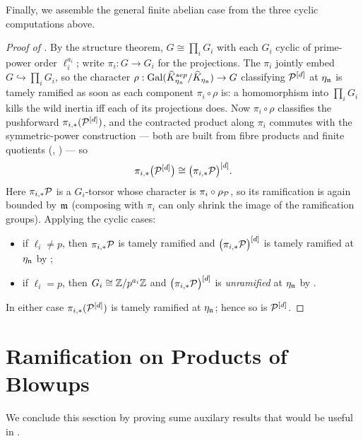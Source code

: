 Finally, we assemble the general finite abelian case from the three cyclic
computations above.

\begin{proof}[Proof of ]
    By the structure theorem, $G \cong \prod_i G_i$ with each $G_i$ cyclic of
    prime-power order $\ell_i^{a_i}$; write $\pi_i : G \to G_i$ for the
    projections. The $\pi_i$ jointly embed $G \hookrightarrow \prod_i G_i$, so
    the character $\rho : \operatorname{Gal}(\widehat K_{\eta_{\mathfrak{n}}}^{sep}/\widehat K_{\eta_{\mathfrak{n}}}) \to G$
    classifying $\mathcal{P}^{[d]}$ at $\eta_{\mathfrak{n}}$ is tamely ramified as soon as each
    component $\pi_i \circ \rho$ is: a homomorphism into $\prod_i G_i$ kills the
    wild inertia iff each of its projections does. Now $\pi_i \circ \rho$
    classifies the pushforward $\pi_{i,*}(\mathcal{P}^{[d]})$, and the contracted
    product along $\pi_i$ commutes with the symmetric-power construction --- both
    are built from fibre products and finite quotients
    (, ) ---
    so
    \[
        \pi_{i,*}\bigl(\mathcal{P}^{[d]}\bigr) \cong \bigl(\pi_{i,*}\mathcal{P}\bigr)^{[d]}.
    \]
    Here $\pi_{i,*}\mathcal{P}$ is a $G_i$-torsor whose character is $\pi_i \circ \rho_{\mathcal{P}}$,
    so its ramification is again bounded by $\mathfrak{m}$ (composing with $\pi_i$ can
    only shrink the image of the ramification groups). Applying the cyclic cases:
    \begin{itemize}
        \item if $\ell_i \neq p$, then $\pi_{i,*}\mathcal{P}$ is tamely ramified and
        $\bigl(\pi_{i,*}\mathcal{P}\bigr)^{[d]}$ is tamely ramified at $\eta_{\mathfrak{n}}$ by
        ;
        \item if $\ell_i = p$, then $G_i \cong \mathbb{Z}/p^{a_i}\mathbb{Z}$ and
        $\bigl(\pi_{i,*}\mathcal{P}\bigr)^{[d]}$ is \emph{unramified} at $\eta_{\mathfrak{n}}$ by
        .
    \end{itemize}
    In either case $\pi_{i,*}(\mathcal{P}^{[d]})$ is tamely ramified at $\eta_{\mathfrak{n}}$;
    hence so is $\mathcal{P}^{[d]}$.
\end{proof}




\section{Ramification on Products of Blowups}\label{subsection:ram_prod_analysis:reorg}
We conclude this sesction by proving sume auxilary results that would be useful in .


